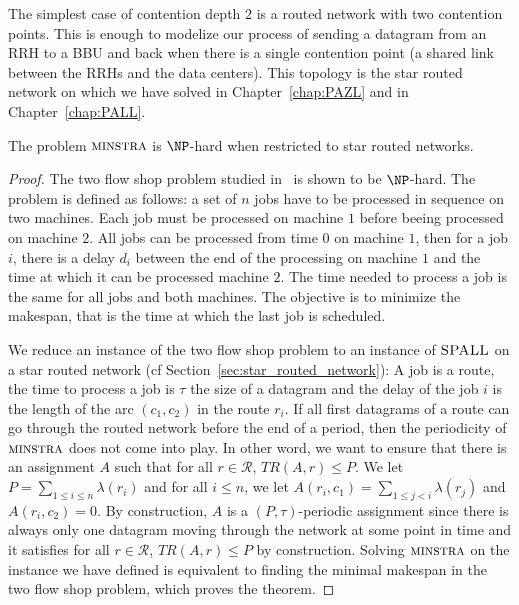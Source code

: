 The simplest case of contention depth $2$ is a routed network with two contention points. 
This is enough to modelize our process of sending a datagram from an RRH to a BBU and back when
there is a single contention point (a shared link between the RRHs and the data centers). 
This topology is the star routed network on which we have solved \pazl in Chapter~\ref{chap:PAZL} and \pall in Chapter~\ref{chap:PALL}.


 \begin{theorem}\label{th:spallHard}
The problem $\textsc{minstra}$ is $\NP$-hard when restricted to star routed networks.
\end{theorem}
\begin{proof}
The two flow shop problem studied in~\cite{yu2004minimizing} is shown to be $\NP$-hard. The problem is defined as follows: a set of $n$ jobs have to be processed in sequence on two machines. Each job must be processed on machine $1$ before beeing processed on machine $2$. All jobs can be processed from time $0$ on machine $1$, then for a job $i$, there is a delay $d_i$ between the end of the processing on machine $1$ and the time at which it can be processed machine $2$.  The time needed to process a job is the same for all jobs and both machines. The objective is to minimize the makespan, that is the time at which the last job is scheduled.

We reduce an instance of the two flow shop problem to an instance of $\textsc{SPALL}$ on a star routed network (cf Section~\ref{sec:star_routed_network}): A job is a route, the time to process a job is $\tau$ the size of a datagram and 
 the delay of the job $i$ is the length of the arc $(c_1,c_2)$ in the route $r_i$. If all first datagrams of a route can 
 go through the routed network before the end of a period, then the periodicity of $\textsc{minstra}$ does not come into play.
 In other word, we want to ensure that there is an assignment $A$ such that for all $r \in \mathcal{R}$, $TR(A,r) \leq P$.
 We let $P = \sum_{1 \leq i\leq n} \lambda(r_i)$ and for all $i \leq n$, we let $A(r_i,c_1) = \sum_{1 \leq j < i} \lambda(r_j)$ and $A(r_i,c_2)=0$. By construction, $A$ is a $(P,\tau)$-periodic assignment since there is always only one datagram
 moving through the network at some point in time and it satisfies  for all $r \in \mathcal{R}$, $TR(A,r) \leq P$ by construction.
 Solving $\textsc{minstra}$ on the instance we have defined is equivalent to finding the minimal makespan in the two flow shop problem, which proves the theorem.
\end{proof}


